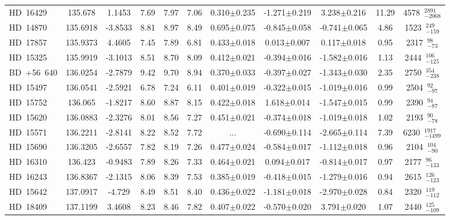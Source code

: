 {\begin{longtable}{lcccccccccc}
HD~16429 & 135.678 & 1.1453 & 7.69 & 7.97 & 7.06 & 0.310$\pm$0.235 & -1.271$\pm$0.219 & 3.238$\pm$0.216 & 11.29 & 4578~$_{-2068}^{2891}$ \\
\noalign{\smallskip}
HD~14870 & 135.6918 & -3.8533 & 8.81 & 8.97 & 8.49 & 0.695$\pm$0.075 & -0.845$\pm$0.058 & -0.741$\pm$0.065 & 4.86 & 1523~$_{-159}^{249}$ \\
\noalign{\smallskip}
HD~17857 & 135.9373 & 4.4605 & 7.45 & 7.89 & 6.81 & 0.433$\pm$0.018 & 0.013$\pm$0.007 & 0.117$\pm$0.018 & 0.95 & 2317~$_{-73}^{98}$ \\
\noalign{\smallskip}
HD~15325 & 135.9919 & -3.1013 & 8.51 & 8.70 & 8.09 & 0.412$\pm$0.021 & -0.394$\pm$0.016 & -1.582$\pm$0.016 & 1.13 & 2444~$_{-125}^{106}$ \\
\noalign{\smallskip}
BD~+56~640 & 136.0254 & -2.7879 & 9.42 & 9.70 & 8.94 & 0.370$\pm$0.033 & -0.397$\pm$0.027 & -1.343$\pm$0.030 & 2.35 & 2750~$_{-238}^{354}$ \\
\noalign{\smallskip}
HD~15497 & 136.0541 & -2.5921 & 6.78 & 7.24 & 6.11 & 0.401$\pm$0.019 & -0.322$\pm$0.015 & -1.019$\pm$0.016 & 0.99 & 2504~$_{-97}^{92}$ \\
\noalign{\smallskip}
HD~15752 & 136.065 & -1.8217 & 8.60 & 8.87 & 8.15 & 0.422$\pm$0.018 & 1.618$\pm$0.014 & -1.547$\pm$0.015 & 0.99 & 2390~$_{-87}^{94}$ \\
\noalign{\smallskip}
HD~15620 & 136.0883 & -2.3276 & 8.01 & 8.56 & 7.27 & 0.451$\pm$0.021 & -0.374$\pm$0.018 & -1.019$\pm$0.018 & 1.02 & 2193~$_{-78}^{90}$ \\
\noalign{\smallskip}
HD~15571 & 136.2211 & -2.8141 & 8.22 & 8.52 & 7.72 & ... & -0.690$\pm$0.114 & -2.665$\pm$0.114 & 7.39 & 6230~$_{-1499}^{1917}$ \\
\noalign{\smallskip}
HD~15690 & 136.3205 & -2.6557 & 7.82 & 8.19 & 7.26 & 0.477$\pm$0.024 & -0.584$\pm$0.017 & -1.112$\pm$0.018 & 0.96 & 2104~$_{-90}^{104}$ \\
\noalign{\smallskip}
HD~16310 & 136.423 & -0.9483 & 7.89 & 8.26 & 7.33 & 0.464$\pm$0.021 & 0.094$\pm$0.017 & -0.814$\pm$0.017 & 0.97 & 2177~$_{-133}^{96}$ \\
\noalign{\smallskip}
HD~16243 & 136.8367 & -2.1315 & 8.06 & 8.39 & 7.53 & 0.385$\pm$0.019 & -0.418$\pm$0.015 & -1.279$\pm$0.016 & 0.94 & 2615~$_{-123}^{126}$ \\
\noalign{\smallskip}
HD~15642 & 137.0917 & -4.729 & 8.49 & 8.51 & 8.40 & 0.436$\pm$0.022 & -1.181$\pm$0.018 & -2.970$\pm$0.028 & 0.84 & 2320~$_{-112}^{119}$ \\
\noalign{\smallskip}
HD~18409 & 137.1199 & 3.4608 & 8.23 & 8.46 & 7.82 & 0.407$\pm$0.022 & -0.570$\pm$0.020 & 3.791$\pm$0.020 & 1.07 & 2440~$_{-109}^{125}$ \\

\end{longtable}}
